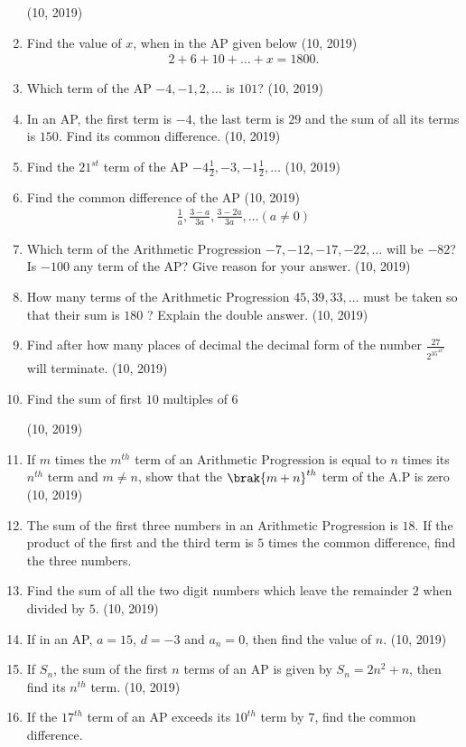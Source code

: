 \begin{enumerate}[label=\thesubsection.\arabic*,ref=\thesubsection.\theenumi,itemsep=1pt]
%
\hfill (10, 2019) \item Find the value of $x$, when in the AP given below
\hfill (10, 2019)
\begin{align*}
2 + 6 + 10 + \dots + x = 1800.    
\end{align*}
 \item Which term of the AP $-4, - 1, 2, \dots$ is $ 101$?
\hfill (10, 2019) \item In an AP, the first term is $- 4$, the last term is $29$ and the sum of all its terms is $150$. Find its common difference.
\hfill (10, 2019) \item Find the $21^{st}$ term of the AP $-4 \frac{1}{2},-3,-1\frac{1}{2}, \dots $
\hfill (10, 2019) \item Find the common difference of the AP 
\hfill (10, 2019)
\begin{align*}
\frac{1}{a} , \frac{3-a}{3a},\frac{3-2a}{3a} , \dots (a \neq 0)
\end{align*}
 \item Which term of the Arithmetic Progression $-7, -12, -17, -22, \dots$ will be $-82$? Is $-100$ any term of the AP? Give reason for your answer.
\hfill (10, 2019) \item How many terms of the Arithmetic Progression $45, 39, 33,  \dots  $ must be taken so that their sum is $180$ ? Explain the double answer.
\hfill (10, 2019) \item Find after how many places of decimal the decimal form of the number $\frac {27}{2^35^43^2}$ will terminate.
\hfill (10, 2019) \item Find the sum of first $10$ multiples of $6$

\hfill (10, 2019) \item If $m$ times the $m^{th}$ term of an Arithmetic Progression is equal to $n$ times
its $n^{th}$ term and $m \neq n$, show that the $\brak{m + n}^{th}$ term of the A.P is zero
\hfill (10, 2019) \item The sum of the first three numbers in an Arithmetic Progression is $18$. If the product of the first and the third term is $5$ times the common
difference, find the three numbers.
 \item Find the sum of all the two digit numbers which leave the remainder $2$ when divided by $5$.
\hfill (10, 2019) \item If in an AP, $a=15$, $d=-3$ and $a_n=0$, then find the value of $n$.
\hfill (10, 2019) \item If ${S_n}$, the sum of the first ${n}$ terms of an AP is given by ${S_n = 2n^2 + n}$, then find its $n^{th}$ term. 
\hfill (10, 2019) \item If the $17^{th}$ term of an AP exceeds its $10^{th}$ term by $7$, find the common difference.


\end{enumerate}
